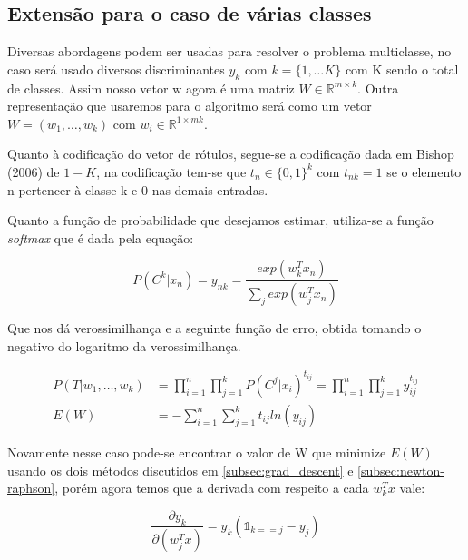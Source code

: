 \subsection{Extensão para o caso de várias classes}

Diversas abordagens podem ser usadas para resolver o problema multiclasse, no
caso será usado diversos discriminantes $y_k$ com $k = \{1, \ldots K\}$ com K
sendo o total de classes. Assim nosso vetor w agora é uma matriz
$W \in \mathbb{R}^{m \times k}$. Outra representação que usaremos para o algoritmo
será como um vetor $W = (w_1, \ldots, w_k)$ com $w_i \in \mathbb{R}^{1 \times mk}$.

Quanto à codificação do vetor de rótulos, 
segue-se a codificação dada em Bishop (2006)\cite{bishop2006} de $1-K$,
na codificação tem-se que $t_n \in \{0, 1\}^k$ com $t_{nk} = 1$ se o elemento
n pertencer à classe k e 0 nas demais entradas. 

Quanto a função de probabilidade que desejamos estimar, utiliza-se a função
\textit{softmax} que é dada pela equação:

\begin{center}
	\begin{equation}
		P(C^k | x_n) = y_{nk} = \frac{exp(w_k^Tx_n)}{\sum_j exp(w_j^Tx_n)} 
	\end{equation}
\end{center}

Que nos dá verossimilhança e a seguinte função de erro, obtida
tomando o negativo do logaritmo da verossimilhança.

\begin{center}
	\begin{align*}
				P(T | w_1, \ldots, w_k) &= \prod_{i = 1}^{n} \prod_{j = 1}^{k} P(C^j | x_i)^{t_{ij}} = \prod_{i = 1}^{n} \prod_{j = 1}^{k} y_{ij}^{t_{ij}} \\
		E(W) &= - \sum_{i = 1}^{n} \sum_{j = 1}^{k} t_{ij} ln(y_{ij})	
	\end{align*}
\end{center}

Novamente nesse caso pode-se encontrar o valor de W que minimize $E(W)$ usando os
dois métodos discutidos em \ref{subsec:grad_descent} e \ref{subsec:newton-raphson},
porém agora temos que a derivada com respeito a cada $w_k^Tx$ vale:

\begin{center}
	\begin{equation}\label{eq:softmax_derivative}
		\frac{\partial y_k}{\partial (w_j^Tx)} = y_k(\mathds{1}_{k == j} - y_j)
	\end{equation}
\end{center}

